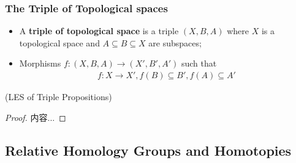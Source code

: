 \documentclass[Total.tex]{subfiles}
\begin{document}
			\subsubsection{The Triple of Topological spaces}
			\begin{Def}
				\begin{itemize}
					\item A \textbf{triple of topological space} is a triple $(X,B,A)$ where $X$ is a topological space and $A\subseteq B\subseteq X$ are subspaces;
					\item Morphisms $f:(X,B,A)\rightarrow (X',B',A')$ such that
					\begin{gather*}
						f:X\rightarrow X',f(B)\subseteq B',f(A)\subseteq A'
					\end{gather*}
				\end{itemize}
			\end{Def}
			\begin{proposition}
				(LES of Triple Propositions)
			\end{proposition}
			\begin{proof}
				内容...
			\end{proof}
			\subsection{Relative Homology Groups and Homotopies}
	
\end{document}

